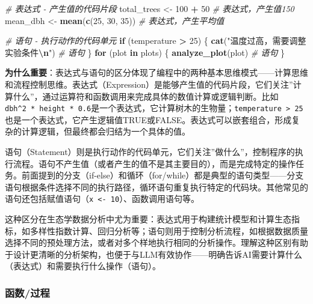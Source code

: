 \documentclass[
]{book}
\newenvironment{Shaded}{\begin{snugshade}}{\end{snugshade}}
\newcommand{\CommentTok}[1]{\textcolor[rgb]{0.56,0.35,0.01}{\textit{#1}}}
\newcommand{\ControlFlowTok}[1]{\textcolor[rgb]{0.13,0.29,0.53}{\textbf{#1}}}
\newcommand{\DecValTok}[1]{\textcolor[rgb]{0.00,0.00,0.81}{#1}}
\newcommand{\FunctionTok}[1]{\textcolor[rgb]{0.13,0.29,0.53}{\textbf{#1}}}
\newcommand{\NormalTok}[1]{#1}
\newcommand{\OtherTok}[1]{\textcolor[rgb]{0.56,0.35,0.01}{#1}}
\newcommand{\SpecialCharTok}[1]{\textcolor[rgb]{0.81,0.36,0.00}{\textbf{#1}}}
\newcommand{\StringTok}[1]{\textcolor[rgb]{0.31,0.60,0.02}{#1}}
\begin{document}
\begin{Shaded}
\begin{Highlighting}[]
\CommentTok{\# 表达式 {-} 产生值的代码片段}
\NormalTok{total\_trees }\OtherTok{\textless{}{-}} \DecValTok{100} \SpecialCharTok{+} \DecValTok{50}  \CommentTok{\# 表达式，产生值150}
\NormalTok{mean\_dbh }\OtherTok{\textless{}{-}} \FunctionTok{mean}\NormalTok{(}\FunctionTok{c}\NormalTok{(}\DecValTok{25}\NormalTok{, }\DecValTok{30}\NormalTok{, }\DecValTok{35}\NormalTok{))  }\CommentTok{\# 表达式，产生平均值}

\CommentTok{\# 语句 {-} 执行动作的代码单元}
\ControlFlowTok{if}\NormalTok{ (temperature }\SpecialCharTok{\textgreater{}} \DecValTok{25}\NormalTok{) \{}
  \FunctionTok{cat}\NormalTok{(}\StringTok{"温度过高，需要调整实验条件}\SpecialCharTok{\textbackslash{}n}\StringTok{"}\NormalTok{)  }\CommentTok{\# 语句}
\NormalTok{\}}
\ControlFlowTok{for}\NormalTok{ (plot }\ControlFlowTok{in}\NormalTok{ plots) \{}
  \FunctionTok{analyze\_plot}\NormalTok{(plot)  }\CommentTok{\# 语句}
\NormalTok{\}}
\end{Highlighting}
\end{Shaded}

\textbf{为什么重要}：表达式与语句的区分体现了编程中的两种基本思维模式------计算思维和流程控制思维。表达式（Expression）是能够产生值的代码片段，它们关注''计算什么''，通过运算符和函数调用来完成具体的数值计算或逻辑判断。比如\texttt{dbh\^{}2\ *\ height\ *\ 0.6}是一个表达式，它计算树木的生物量；\texttt{temperature\ \textgreater{}\ 25}也是一个表达式，它产生逻辑值TRUE或FALSE。表达式可以嵌套组合，形成复杂的计算逻辑，但最终都会归结为一个具体的值。

语句（Statement）则是执行动作的代码单元，它们关注''做什么''，控制程序的执行流程。语句不产生值（或者产生的值不是其主要目的），而是完成特定的操作任务。前面提到的分支（if-else）和循环（for/while）都是典型的语句类型------分支语句根据条件选择不同的执行路径，循环语句重复执行特定的代码块。其他常见的语句还包括赋值语句（\texttt{x\ \textless{}-\ 10}）、函数调用语句等。

这种区分在生态学数据分析中尤为重要：表达式用于构建统计模型和计算生态指标，如多样性指数计算、回归分析等；语句则用于控制分析流程，如根据数据质量选择不同的预处理方法，或者对多个样地执行相同的分析操作。理解这种区别有助于设计更清晰的分析架构，也便于与LLM有效协作------明确告诉AI需要计算什么（表达式）和需要执行什么操作（语句）。

\hypertarget{ux51fdux6570ux8fc7ux7a0b}{%
\subsubsection{函数/过程}\label{ux51fdux6570ux8fc7ux7a0b}}
\end{document}

